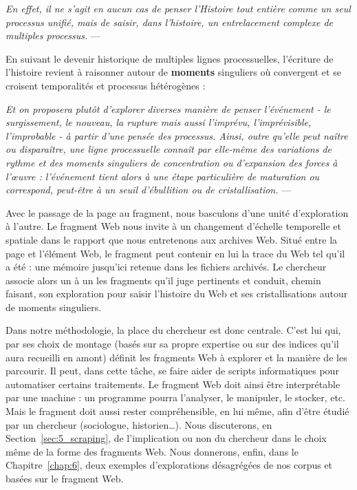 \documentclass[symmetric,justified,marginals=raggedouter]{tufte-book}
\begin{document}
\begin{fullwidth}
\og\textit{En effet, il ne s'agit en aucun cas de penser l'Histoire tout entière comme un seul processus unifié, mais de saisir, dans l'histoire, un entrelacement complexe de multiples processus.}\fg{} --- \citep[p.227]{baschet_defaire_2018}\\
\end{fullwidth} 

\noindent En suivant le devenir historique de multiples lignes processuelles, l'écri\-ture de l'histoire revient à raisonner autour de \textbf{moments} singuliers où convergent et se croisent temporalités et processus hétérogènes :\\

\begin{fullwidth}
\og\textit{Et on proposera plutôt d'explorer diverses manière de penser l'événement - le surgissement, le nouveau, la rupture mais aussi l'imprévu, l'imprévisible, l'improbable - à partir d'une pensée des processus. Ainsi, outre qu'elle peut naître ou disparaître, une ligne processuelle connaît par elle-même  des variations de rythme et des moments singuliers de concentration ou d'expansion des forces à l'œuvre : l'événement tient alors à une étape particulière de maturation ou correspond, peut-être à un seuil d'ébullition ou de cristallisation.}\fg{} --- \citep[p.227-228]{baschet_defaire_2018}\\
\end{fullwidth} 

\noindent Avec le passage de la page au fragment, nous basculons d'une unité d'exploration à l'autre. Le fragment Web nous invite à un changement d'échelle temporelle et spatiale dans le rapport que nous entretenons aux archives Web. Situé entre la page et l'élément Web, le fragment peut contenir en lui la trace du Web tel qu'il a été : une mémoire jusqu'ici retenue dans les fichiers archivés. Le chercheur associe alors un à un les fragments qu'il juge pertinents et conduit, chemin faisant, son exploration pour saisir l'histoire du Web et ses cristallisations autour de moments singuliers. 

Dans notre méthodologie, la place du chercheur est donc centrale. C'est lui qui, par ses choix de montage (basés sur sa propre expertise ou sur des indices qu'il aura recueilli en amont) définit les fragments Web à explorer et la manière de les parcourir. Il peut, dans cette tâche, se faire aider de scripts informatiques pour automatiser certains traitements. Le fragment Web doit ainsi être interprétable par une machine : un programme pourra l'analyser, le manipuler, le stocker, etc. Mais le fragment doit aussi rester compréhensible, en lui même, afin d'être étudié par un chercheur (sociologue, historien\ldots{}). Nous discuterons, en Section~\ref{sec:5_scraping}, de l'implication ou non du chercheur dans le choix même de la forme des fragments Web. Nous donnerons, enfin, dans le Chapitre~\ref{chap:6}, deux exemples d'explorations désagrégées de nos corpus et basées sur le fragment Web.
\end{document}
